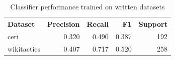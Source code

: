 \begin{table}[t]
\caption{Classifier performance trained on written datasets}
\label{tab:metrics_written}
\begin{tabular}{lrrrr}
\toprule
Dataset & Precision & Recall & F1 & Support \\
\midrule
ceri & 0.320 & 0.490 & 0.387 & 192 \\
wikitactics & 0.407 & 0.717 & 0.520 & 258 \\
\bottomrule
\end{tabular}
\end{table}
